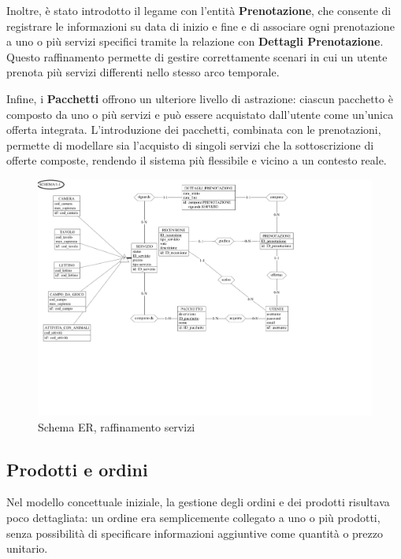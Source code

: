 \documentclass[a4paper,12pt]{report}
\begin{document}
\vspace{\baselineskip}
Inoltre, è stato introdotto il legame con l'entità \textbf{Prenotazione}, che consente di registrare le informazioni su data di inizio
e fine e di associare ogni prenotazione a uno o più servizi specifici tramite la relazione con \textbf{Dettagli Prenotazione}. Questo
raffinamento permette di gestire correttamente scenari in cui un utente prenota più servizi differenti nello stesso arco
temporale.

\vspace{\baselineskip}
Infine, i \textbf{Pacchetti} offrono un ulteriore livello di astrazione: ciascun pacchetto è composto da uno o più servizi e può essere
acquistato dall'utente come un'unica offerta integrata. L'introduzione dei pacchetti, combinata con le prenotazioni, permette
di modellare sia l'acquisto di singoli servizi che la sottoscrizione di offerte composte, rendendo il sistema più flessibile e
vicino a un contesto reale.

\begin{figure}[H]
	\centering
	\includegraphics[width=\textwidth, trim=0 200pt 175pt 0, clip]{./pdf/raffinamento servizi.pdf}
	\caption{Schema ER, raffinamento servizi}
	\label{fig:raffinamento-servizi}
\end{figure}

\newpage
\subsection{Prodotti e ordini}
Nel modello concettuale iniziale, la gestione degli ordini e dei prodotti risultava poco dettagliata: un ordine era
semplicemente collegato a uno o più prodotti, senza possibilità di specificare informazioni aggiuntive come quantità o
prezzo unitario.
\end{document}
